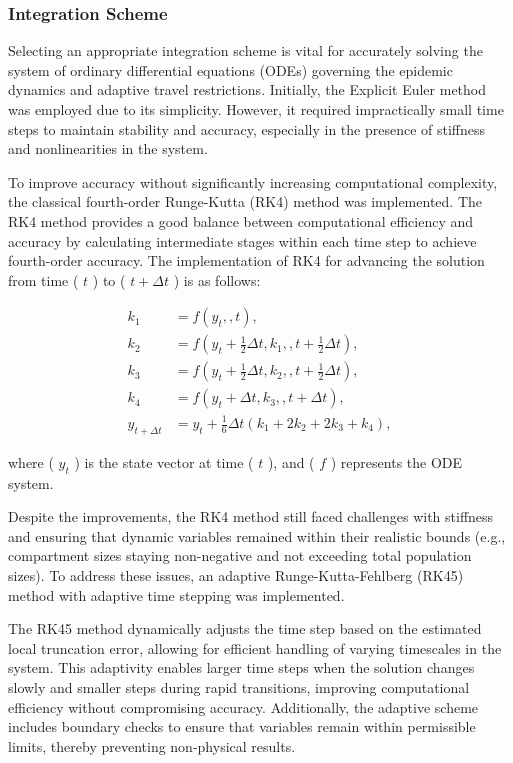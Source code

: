 \subsubsection{Integration Scheme}

Selecting an appropriate integration scheme is vital for accurately solving the system of ordinary differential equations (ODEs) governing the epidemic dynamics and adaptive travel restrictions. Initially, the Explicit Euler method was employed due to its simplicity. However, it required impractically small time steps to maintain stability and accuracy, especially in the presence of stiffness and nonlinearities in the system.

To improve accuracy without significantly increasing computational complexity, the classical fourth-order Runge-Kutta (RK4) method was implemented. The RK4 method provides a good balance between computational efficiency and accuracy by calculating intermediate stages within each time step to achieve fourth-order accuracy. The implementation of RK4 for advancing the solution from time ( $t$ ) to ( $t + \Delta t$ ) is as follows:

\begin{align*} 
	k_1 &= f\left(y_t,, t\right), \\ k_2 &= f\left(y_t + \tfrac{1}{2}\Delta t, k_1,, t + \tfrac{1}{2}\Delta t\right), \\ k_3 &= f\left(y_t + \tfrac{1}{2}\Delta t, k_2,, t + \tfrac{1}{2}\Delta t\right), \\ k_4 &= f\left(y_t + \Delta t, k_3,, t + \Delta t\right), \\ y_{t + \Delta t} &= y_t + \tfrac{1}{6}\Delta t\left(k_1 + 2k_2 + 2k_3 + k_4\right), \end{align*}

where ( $y_t$ ) is the state vector at time ( $t$ ), and ( $f$ ) represents the ODE system.

Despite the improvements, the RK4 method still faced challenges with stiffness and ensuring that dynamic variables remained within their realistic bounds (e.g., compartment sizes staying non-negative and not exceeding total population sizes). To address these issues, an adaptive Runge-Kutta-Fehlberg (RK45) method with adaptive time stepping was implemented.

The RK45 method dynamically adjusts the time step based on the estimated local truncation error, allowing for efficient handling of varying timescales in the system. This adaptivity enables larger time steps when the solution changes slowly and smaller steps during rapid transitions, improving computational efficiency without compromising accuracy. Additionally, the adaptive scheme includes boundary checks to ensure that variables remain within permissible limits, thereby preventing non-physical results.


